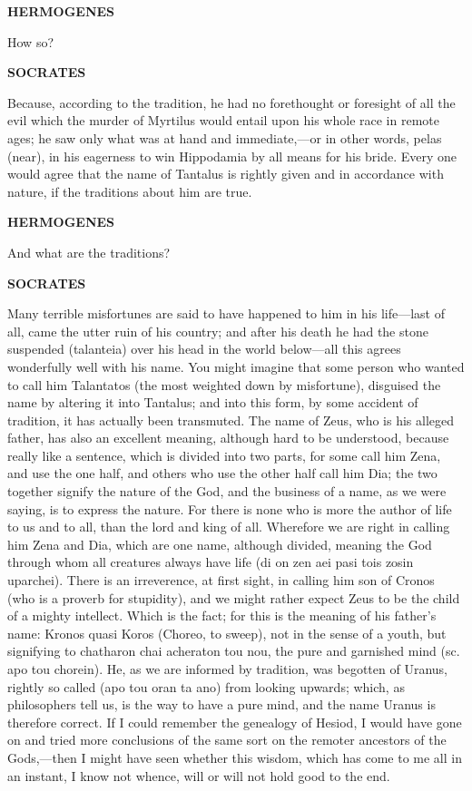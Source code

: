 \documentclass[11pt,letter]{article}
\begin{document}
\par \textbf{HERMOGENES}
\par   How so?

\par \textbf{SOCRATES}
\par   Because, according to the tradition, he had no forethought or foresight of all the evil which the murder of Myrtilus would entail upon his whole race in remote ages; he saw only what was at hand and immediate,—or in other words, pelas (near), in his eagerness to win Hippodamia by all means for his bride. Every one would agree that the name of Tantalus is rightly given and in accordance with nature, if the traditions about him are true.

\par \textbf{HERMOGENES}
\par   And what are the traditions?

\par \textbf{SOCRATES}
\par   Many terrible misfortunes are said to have happened to him in his life—last of all, came the utter ruin of his country; and after his death he had the stone suspended (talanteia) over his head in the world below—all this agrees wonderfully well with his name. You might imagine that some person who wanted to call him Talantatos (the most weighted down by misfortune), disguised the name by altering it into Tantalus; and into this form, by some accident of tradition, it has actually been transmuted. The name of Zeus, who is his alleged father, has also an excellent meaning, although hard to be understood, because really like a sentence, which is divided into two parts, for some call him Zena, and use the one half, and others who use the other half call him Dia; the two together signify the nature of the God, and the business of a name, as we were saying, is to express the nature. For there is none who is more the author of life to us and to all, than the lord and king of all. Wherefore we are right in calling him Zena and Dia, which are one name, although divided, meaning the God through whom all creatures always have life (di on zen aei pasi tois zosin uparchei). There is an irreverence, at first sight, in calling him son of Cronos (who is a proverb for stupidity), and we might rather expect Zeus to be the child of a mighty intellect. Which is the fact; for this is the meaning of his father’s name:  Kronos quasi Koros (Choreo, to sweep), not in the sense of a youth, but signifying to chatharon chai acheraton tou nou, the pure and garnished mind (sc. apo tou chorein). He, as we are informed by tradition, was begotten of Uranus, rightly so called (apo tou oran ta ano) from looking upwards; which, as philosophers tell us, is the way to have a pure mind, and the name Uranus is therefore correct. If I could remember the genealogy of Hesiod, I would have gone on and tried more conclusions of the same sort on the remoter ancestors of the Gods,—then I might have seen whether this wisdom, which has come to me all in an instant, I know not whence, will or will not hold good to the end.
\end{document}
